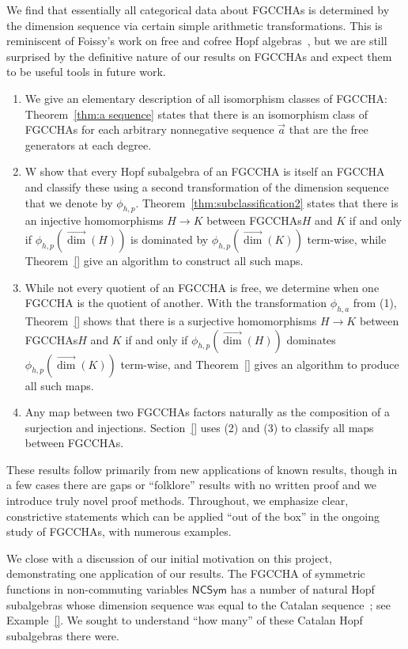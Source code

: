 \documentclass[11pt]{amsart}
\theoremstyle{definition}
\numberwithin{equation}{section}
\newcommand{\FGCCHA}{\textsf{FGCCHA}\xspace}
\newcommand{\FGCCHAs}{\textsf{FGCCHA}s\xspace}
\newcommand{\vecdim}{\overrightarrow{\dim}}
\begin{document}
We find that essentially all categorical data about \FGCCHAs is determined by the dimension sequence via certain simple arithmetic transformations.  
This is reminiscent of Foissy's work on free and cofree Hopf algebras~\cite{F12}, but we are still
surprised by the definitive nature of our results on \FGCCHAs and expect them to be useful tools in future work.
\begin{enumerate}[itemsep = 1ex]
\item We give an elementary description of all isomorphism classes of \FGCCHA:
Theorem~\ref{thm:a sequence} states that there is  an isomorphism class of \FGCCHAs
for each arbitrary nonnegative sequence $\vec{a}$
that are the free generators at each degree.

\item W show that every Hopf subalgebra of an \FGCCHA is itself an \FGCCHA
and classify these using a second transformation of the dimension sequence
that we  denote by $\phi_{h, p}$.  Theorem~\ref{thm:subclassification2} states
that there is an injective homomorphisms $H \to K$ between \FGCCHAs $H$ and $K$
if and only if $\phi_{h, p}(\vecdim(H))$ is dominated by $\phi_{h, p}(\vecdim(K))$
term-wise, while Theorem~\ref{} give an algorithm to construct all such maps.

\item While not every quotient of an \FGCCHA is free, we determine when one \FGCCHA is the quotient of another.  With the transformation $\phi_{h, a}$ from (1), Theorem~\ref{} shows that there is a surjective homomorphisms $H \to K$ between \FGCCHAs $H$ and $K$ if and only if $\phi_{h, p}(\vecdim(H))$ dominates $\phi_{h, p}(\vecdim(K))$ term-wise, and Theorem~\ref{} gives an algorithm to produce all such maps.  

\item Any map between two \FGCCHAs factors naturally as the  composition of a surjection and injections.  Section~\ref{} uses (2) and (3) to classify all maps between \FGCCHAs.

\end{enumerate}
These results follow primarily from new applications of known results, though in a few cases there are gaps or ``folklore'' results with no written proof and we introduce truly novel proof methods.  
Throughout, we emphasize clear, constrictive statements which can be applied ``out of the box'' in the ongoing study of \FGCCHAs, with numerous examples.

We close with a discussion of our initial motivation on this project, demonstrating one application of our results.  
The \FGCCHA of symmetric functions in non-commuting variables $\mathsf{NCSym}$ has a number of natural Hopf subalgebras whose dimension sequence was equal to the Catalan sequence~\cite[\href{https://oeis.org/A000108}{A000108}]{OEIS}; see Example~\ref{}.  
We sought to understand ``how many'' of these Catalan Hopf subalgebras there were.
\end{document}
